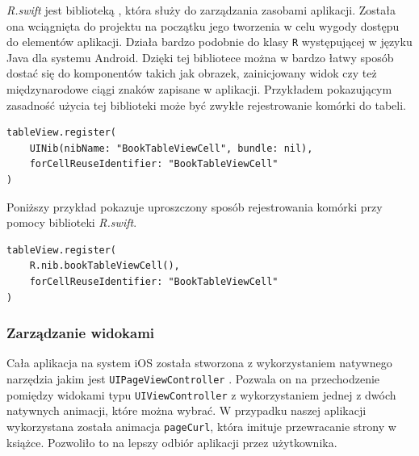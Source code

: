 \documentclass[twoside]{projektInzynierskiMS}
\begin{document}
\textit{R.swift} jest biblioteką \cite{Rswift}, która służy do zarządzania zasobami aplikacji. Została ona wciągnięta do projektu na początku jego tworzenia w celu wygody dostępu do elementów aplikacji. Działa bardzo podobnie do klasy \verb`R` występującej w języku Java dla systemu Android. Dzięki tej bibliotece można w bardzo łatwy sposób dostać się do komponentów takich jak obrazek, zainicjowany widok czy też międzynarodowe ciągi znaków zapisane w aplikacji. Przykładem pokazującym zasadność użycia tej biblioteki może być zwykłe rejestrowanie komórki do tabeli.
\begin{verbatim}
tableView.register(
    UINib(nibName: "BookTableViewCell", bundle: nil),
    forCellReuseIdentifier: "BookTableViewCell"
)
\end{verbatim}
Poniższy przykład pokazuje uproszczony sposób rejestrowania komórki przy pomocy biblioteki \textit{R.swift}.
\begin{verbatim}
tableView.register(
    R.nib.bookTableViewCell(),
    forCellReuseIdentifier: "BookTableViewCell"
)
\end{verbatim}


\subsubsection{Zarządzanie widokami}

Cała aplikacja na system iOS została stworzona z wykorzystaniem natywnego narzędzia jakim jest \verb`UIPageViewController` \cite{AppleDeveloper}. Pozwala on na przechodzenie pomiędzy widokami typu \verb`UIViewController` z wykorzystaniem jednej z dwóch natywnych animacji, które można wybrać. W przypadku naszej aplikacji wykorzystana została animacja \verb`pageCurl`, która imituje przewracanie strony w książce. Pozwoliło to na lepszy odbiór aplikacji przez użytkownika.
\end{document}
